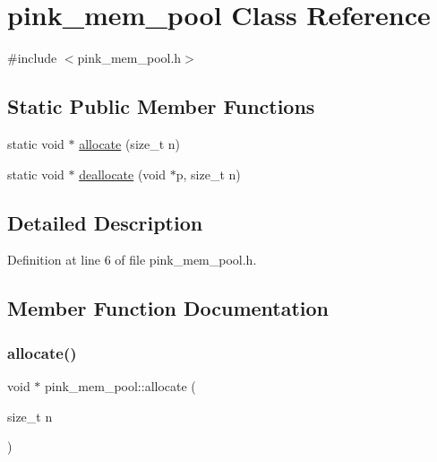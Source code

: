 \hypertarget{classpink__mem__pool}{}\section{pink\+\_\+mem\+\_\+pool Class Reference}
\label{classpink__mem__pool}


{\ttfamily \#include $<$pink\+\_\+mem\+\_\+pool.\+h$>$}

\subsection*{Static Public Member Functions}
\begin{DoxyCompactItemize}
\item 
static void $\ast$ \hyperlink{classpink__mem__pool_a4d49dea3bf3b915e30f105e7027ef07d}{allocate} (size\+\_\+t n)
\item 
static void $\ast$ \hyperlink{classpink__mem__pool_a4558b3b63009b917441d763619eeb4f4}{deallocate} (void $\ast$p, size\+\_\+t n)
\end{DoxyCompactItemize}


\subsection{Detailed Description}


Definition at line 6 of file pink\+\_\+mem\+\_\+pool.\+h.



\subsection{Member Function Documentation}
\mbox{\label{classpink__mem__pool_a4d49dea3bf3b915e30f105e7027ef07d}} 
\subsubsection{\texorpdfstring{allocate()}{allocate()}}
{\footnotesize\ttfamily void $\ast$ pink\+\_\+mem\+\_\+pool\+::allocate (\begin{DoxyParamCaption}\item[{size\+\_\+t}]{n }\end{DoxyParamCaption})\hspace{0.3cm}{\ttfamily [static]}}



